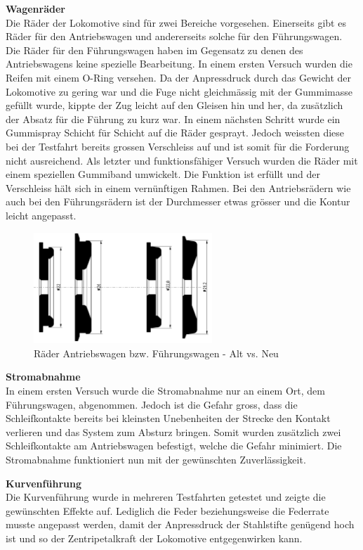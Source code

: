 \documentclass[../../main.tex]{subfiles}
\begin{document}
\textbf{Wagenräder}\\
Die Räder der Lokomotive sind für zwei Bereiche vorgesehen. Einerseits gibt es Räder für den Antriebswagen und andererseits solche für den Führungswagen. Die Räder für den Führungswagen haben im Gegensatz zu denen des Antriebswagens keine spezielle Bearbeitung. In einem ersten Versuch wurden die Reifen mit einem O-Ring versehen. Da der Anpressdruck durch das Gewicht der Lokomotive zu gering war und die Fuge nicht gleichmässig mit der Gummimasse gefüllt wurde, kippte der Zug leicht auf den Gleisen hin und her, da zusätzlich der Absatz für die Führung zu kurz war. In einem nächsten Schritt wurde ein Gummispray Schicht für Schicht auf die Räder gesprayt. Jedoch weissten diese bei der Testfahrt bereits grossen Verschleiss auf und ist somit für die Forderung nicht ausreichend. Als letzter und funktionsfähiger Versuch wurden die Räder mit einem speziellen Gummiband umwickelt. Die Funktion ist erfüllt und der Verschleiss hält sich in einem vernünftigen Rahmen. Bei den Antriebsrädern wie auch bei den Führungsrädern ist der Durchmesser etwas grösser und die Kontur leicht angepasst.\\

\begin{figure}[H]
  \centering
  \includegraphics[width=0.6\textwidth]{wagenraeder.PNG}
  \caption {Räder Antriebswagen bzw. Führungswagen - Alt vs. Neu}
  \label{fig:raeder}
\end{figure}

\pagebreak

\textbf{Stromabnahme}\\
In einem ersten Versuch wurde die Stromabnahme nur an einem Ort, dem Führungswagen, abgenommen. Jedoch ist die Gefahr gross, dass die Schleifkontakte bereits bei kleinsten Unebenheiten der Strecke den Kontakt verlieren und das System zum Absturz bringen. Somit wurden zusätzlich zwei Schleifkontakte am Antriebswagen befestigt, welche die Gefahr minimiert. Die Stromabnahme funktioniert nun mit der gewünschten Zuverlässigkeit.

\textbf{Kurvenführung}\\
Die Kurvenführung wurde in mehreren Testfahrten getestet und zeigte die gewünschten Effekte auf. Lediglich die Feder beziehungsweise die Federrate musste angepasst werden, damit der Anpressdruck der Stahlstifte genügend hoch ist und so der Zentripetalkraft der Lokomotive entgegenwirken kann.
\end{document}
